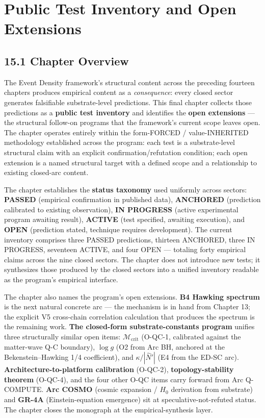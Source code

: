 \documentclass[11pt]{book}
\begin{document}
\newpage


\chapter{Public Test Inventory and Open Extensions}
\label{chap:15}

\section{15.1 Chapter Overview}

The Event Density framework's structural content across the preceding fourteen chapters produces empirical content as a \textit{consequence}: every closed sector generates falsifiable substrate-level predictions. This final chapter collects those predictions as a \textbf{public test inventory} and identifies the \textbf{open extensions} — the structural follow-on programs that the framework's current scope leaves open. The chapter operates entirely within the form-FORCED / value-INHERITED methodology established across the program: each test is a substrate-level structural claim with an explicit confirmation/refutation condition; each open extension is a named structural target with a defined scope and a relationship to existing closed-arc content.

The chapter establishes the \textbf{status taxonomy} used uniformly across sectors: \textbf{PASSED} (empirical confirmation in published data), \textbf{ANCHORED} (prediction calibrated to existing observation), \textbf{IN PROGRESS} (active experimental program awaiting result), \textbf{ACTIVE} (test specified, awaiting execution), and \textbf{OPEN} (prediction stated, technique requires development). The current inventory comprises three PASSED predictions, thirteen ANCHORED, three IN PROGRESS, seventeen ACTIVE, and four OPEN — totaling forty empirical claims across the nine closed sectors. The chapter does not introduce new tests; it synthesizes those produced by the closed sectors into a unified inventory readable as the program's empirical interface.

The chapter also names the program's open extensions. \textbf{B4 Hawking spectrum} is the next natural concrete arc — the mechanism is in hand from Chapter 13; the explicit V5 cross-chain correlation calculation that produces the spectrum is the remaining work. \textbf{The closed-form substrate-constants program} unifies three structurally similar open items: $\mathcal{M}_\mathrm{crit}$ (O-QC-1, calibrated against the matter-wave Q-C boundary), $\log g$ (O2 from Arc BH, anchored at the Bekenstein–Hawking 1/4 coefficient), and $\kappa/|\hat{N}'|$ (E4 from the ED-SC arc). \textbf{Architecture-to-platform calibration} (O-QC-2), \textbf{topology-stability theorem} (O-QC-4), and the four other O-QC items carry forward from Arc Q-COMPUTE. \textbf{Arc COSMO} (cosmic expansion / $H_0$ derivation from substrate) and \textbf{GR-4A} (Einstein-equation emergence) sit at speculative-not-refuted status. The chapter closes the monograph at the empirical-synthesis layer.
\end{document}
